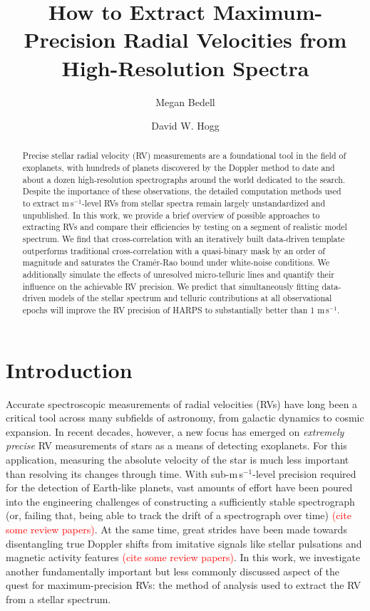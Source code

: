 \documentclass[modern]{aastex61}
\newcommand{\ms}{m\,s$^{-1}$}
\newcommand\todo[1]{\textcolor{red}{#1}}  %
\begin{document}
\graphicspath{ {figures/} }

\title{How to Extract Maximum-Precision Radial Velocities from High-Resolution Spectra}

\author{Megan Bedell}

\author{David W. Hogg}

\begin{abstract}
Precise stellar radial velocity (RV) measurements are a foundational tool in the field of exoplanets, with hundreds of planets discovered by the Doppler method to date and about a dozen high-resolution spectrographs around the world dedicated to the search. Despite the importance of these observations, the detailed computation methods used to extract \ms-level RVs from stellar spectra remain largely unstandardized and unpublished. In this work, we provide a brief overview of possible approaches to extracting RVs and compare their efficiencies by testing on a segment of realistic model spectrum. We find that cross-correlation with an iteratively built data-driven template outperforms traditional cross-correlation with a quasi-binary mask by an order of magnitude and saturates the Cram\'{e}r-Rao bound under white-noise conditions. We additionally simulate the effects of unresolved micro-telluric lines and quantify their influence on the achievable RV precision. We predict that simultaneously fitting data-driven models of the stellar spectrum and telluric contributions at all observational epochs will improve the RV precision of HARPS to substantially better than 1 \ms.
\end{abstract}

\section{Introduction}

Accurate spectroscopic measurements of radial velocities (RVs) have long been a critical tool across many subfields of astronomy, from galactic dynamics to cosmic expansion. In recent decades, however, a new focus has emerged on \textit{extremely precise} RV measurements of stars as a means of detecting exoplanets. For this application, measuring the absolute velocity of the star is much less important than resolving its changes through time. With sub-\ms-level precision required for the detection of Earth-like planets, vast amounts of effort have been poured into the engineering challenges of constructing a sufficiently stable spectrograph (or, failing that, being able to track the drift of a spectrograph over time) \todo{(cite some review papers)}. At the same time, great strides have been made towards disentangling true Doppler shifts from imitative signals like stellar pulsations and magnetic activity features \todo{(cite some review papers)}.  In this work, we investigate another fundamentally important but less commonly discussed aspect of the quest for maximum-precision RVs: the method of analysis used to extract the RV from a stellar spectrum.
\end{document}
